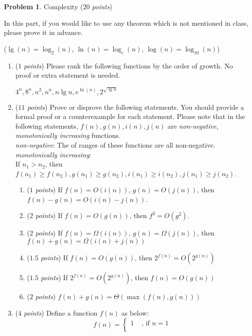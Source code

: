 \documentclass[12pt,a4paper]{report}
\newcommand{\points}[1]{ ($#1$ \textit{points}) }
\theoremstyle{definition}
\newtheorem{problem}{\textbf{Problem}}
\theoremstyle{definition}
\begin{document}
\begin{problem}Complexity\points{20}

In this part, if you would like to use any theorem which is not mentioned in class, please prove it in advance.
\begin{center}
($\lg(n) = \log_2(n)$, $\ln(n) = \log_e(n)$, $\log(n) = \log_{10}(n)$)
\end{center}

\begin{enumerate}[label=\arabic*.]
\item \points{1}Please rank the following functions by the order of growth. No proof or extra statement is needed.
    \begin{center}$4^n, 8^n, n^2, n^n, n\lg n, e^{\ln(n)}, 2^{\sqrt{\lg n}}$\end{center}
\item \points{11}Prove or disprove the following statements. You should provide a formal proof or a counterexample for each statement. Please note that in the following statements, $f(n), g(n), i(n), j(n)$ are \textit{non-negative}, \textit{monotonically increasing} functions.\\
\textit{non-negative}: The of ranges of these functions are all non-negative.\\
\textit{monotonically increasing}:\\ If $n_1>n_2$, then $f(n_1)\geq f(n_2), g(n_1)\geq g(n_2), i(n_1)\geq i(n_2), j(n_1)\geq j(n_2)$.
    \begin{enumerate}[label=\alph*.]
    \item \points{1}If $f(n) = O(i(n))$, $g(n) = O(j(n))$, then $f(n) - g(n) = O(i(n) - j(n))$.
    \item \points{2}If $f(n) = O(g(n))$, then $f^2 = O(g^2)$.
    \item \points{2}If $f(n) = \Omega(i(n))$, $g(n) = \Omega(j(n))$, then $f(n) + g(n) = \Omega(i(n) + j(n))$
    \item \points{1.5}If $f(n) = O(g(n))$, then $2^{f(n)} = O(2^{g(n)})$
    \item \points{1.5}If $2^{f(n)} = O(2^{g(n)})$, then $f(n) = O(g(n))$
    \item \points{2}$f(n) + g(n) = \Theta(\max(f(n), g(n)))$
    \end{enumerate}
\item \points{4}Define a function $f(n)$ as below:
    \begin{equation*}
    f(n) = 
           \begin{cases}
           1 &\text{ , if } n = 1\\

\end{cases}
\end{equation*}
\end{enumerate}
\end{problem}
\end{document}
